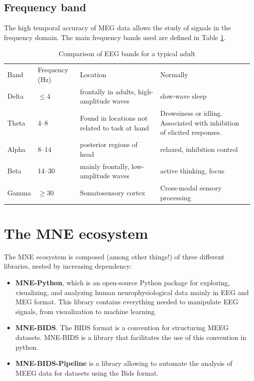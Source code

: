 \subsection{Frequency band}
 
 
The high temporal accuracy of MEG data allows the study of signals in the frequency domain. The main frequency bands used are defined in Table \ref{Tab:neural_freq_band}.
 
\begin{table}[ht]
   \caption{Comparison of EEG bands for a typical adult}
   \centering
   \begin{tabular}{@{}| p{1.2cm}|p{2.5cm}| p{4.5cm}|p{4.5cm}| @{}}
       \hline
       Band  & Frequency (Hz) & Location                                       & Normally                                                                \\
       Delta & $\leq  4$      & frontally in adults, high-amplitude waves      & slow-wave sleep                                                         \\
       Theta & 4–8            & Found in locations not related to task at hand & Drowsiness or idling. Associated with inhibition of elicited responses. \\
       Alpha & 8–14           & posterior regions of head                      & relaxed, inhibition control                                             \\
       Beta  & 14–30          & mainly frontally, low-amplitude waves           & active thinking, focus                                                  \\
       Gamma & $\geq 30$      & Somatosensory cortex                           & Cross-modal sensory processing                 \\
       \hline
   \end{tabular}
   \label{Tab:neural_freq_band}
\end{table}
 
 
\section{The MNE ecosystem}
 
The MNE ecosystem is composed (among other things!) of three different libraries, nested by increasing dependency:
 
\begin{itemize}
   \item \textbf{MNE-Python}, which is an open-source Python package for exploring, visualizing, and analyzing human neurophysiological data mainly in EEG and MEG format. This library contains everything needed to manipulate EEG signals, from visualization to machine learning.
   \item \textbf{MNE-BIDS}. The BIDS format is a convention for structuring MEEG datasets. MNE-BIDS is a library that facilitates the use of this convention in python.
   \item \textbf{MNE-BIDS-Pipeline} is a library allowing to automate the analysis of MEEG data for datasets using the Bids format.
\end{itemize}
 
